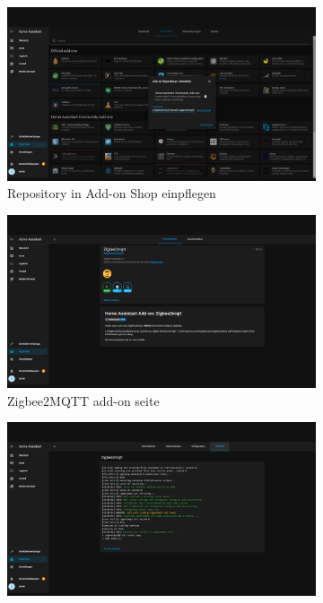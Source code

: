 \begin{figure}[H]
    \begin{subfigure}{.5\linewidth}
        \includegraphics[width=1\textwidth]{img/HA18.png}
        \caption{Repository in Add-on Shop einpflegen}
        \label{fig:ha14}
    \end{subfigure}
    \begin{subfigure}{.5\linewidth}
        \includegraphics[width=1\textwidth]{img/HA20.png}
        \caption{Zigbee2MQTT add-on seite }
        \label{fig:ha16}
    \end{subfigure}
    \begin{subfigure}{.5\linewidth}
        \includegraphics[width=1\textwidth]{img/HA22.png}

\end{subfigure}
\end{figure}
